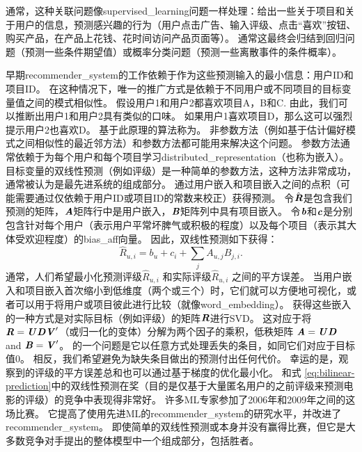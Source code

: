 通常，这种关联问题像\gls{supervised_learning}问题一样处理：给出一些关于项目和关于用户的信息，预测感兴趣的行为（用户点击广告、输入评级、点击``喜欢''按钮、 购买产品，在产品上花钱、花时间访问产品页面等）。
通常这最终会归结到回归问题（预测一些条件期望值）或概率分类问题（预测一些离散事件的条件概率）。

早期\gls{recommender_system}的工作依赖于作为这些预测输入的最小信息：用户ID和项目ID。
在这种情况下，唯一的推广方式是依赖于不同用户或不同项目的目标变量值之间的模式相似性。
假设用户1和用户2都喜欢项目A，B和C.
由此，我们可以推断出用户1和用户2具有类似的口味。
如果用户1喜欢项目D，那么这可以强烈提示用户2也喜欢D。
基于此原理的算法称为。
非参数方法（例如基于估计偏好模式之间相似性的最近邻方法）和参数方法都可能用来解决这个问题。
参数方法通常依赖于为每个用户和每个项目学习\gls{distributed_representation}（也称为嵌入）。
目标变量的双线性预测（例如评级）是一种简单的参数方法，这种方法非常成功，通常被认为是最先进系统的组成部分。
通过用户嵌入和项目嵌入之间的点积（可能需要通过仅依赖于用户ID或项目ID的常数来校正）获得预测。
令$\hat{\boldsymbol{\mathit{R}}}$是包含我们预测的矩阵，$\boldsymbol{\mathit{A}}$矩阵行中是用户嵌入，$\boldsymbol{\mathit{B}}$矩阵列中具有项目嵌入。
令$\boldsymbol{\mathit{b}}$和$\boldsymbol{\mathit{c}}$是分别包含针对每个用户（表示用户平常坏脾气或积极的程度）以及每个项目（表示其大体受欢迎程度）的\gls{bias_aff}向量。
因此，双线性预测如下获得：
\begin{equation}
\label{eq:bilinear-prediction}
 \hat{R}_{u,i} = b_u + c_i + \sum_j A_{u,j} B_{j,i}.
\end{equation}
通常，人们希望最小化预测评级$\hat{R}_{u,i}$ 和实际评级$\hat{R}_{u,i}$ 之间的平方误差。
当用户嵌入和项目嵌入首次缩小到低维度（两个或三个）时，它们就可以方便地可视化，或者可以用于将用户或项目彼此进行比较（就像\gls{word_embedding}）。
获得这些嵌入的一种方式是对实际目标（例如评级）的矩阵$\boldsymbol{\mathit{R}}$进行\gls{SVD}。
这对应于将$\boldsymbol{\mathit{R}} = \boldsymbol{\mathit{U}} \boldsymbol{\mathit{D}} \boldsymbol{\mathit{V}}'$（或归一化的变体）分解为两个因子的乘积，低秩矩阵 $\boldsymbol{\mathit{A}}=\boldsymbol{\mathit{U}} \boldsymbol{\mathit{D}}$ and $\boldsymbol{\mathit{B}} = \boldsymbol{\mathit{V}}'$。
的一个问题是它以任意方式处理丢失的条目，如同它们对应于目标值0。
相反，我们希望避免为缺失条目做出的预测付出任何代价。
幸运的是，观察到的评级的平方误差总和也可以通过基于梯度的优化最小化。
和式 \eqref{eq:bilinear-prediction}中的双线性预测在奖（目的是仅基于大量匿名用户的之前评级来预测电影的评级）的竞争中表现得非常好\citep{bennett2007netflix}。
许多\gls{ML}专家参加了2006年和2009年之间的这场比赛。
它提高了使用先进\gls{ML}的\gls{recommender_system}的研究水平，并改进了\gls{recommender_system}。
即使简单的双线性预测或本身并没有赢得比赛，但它是大多数竞争对手提出的整体模型中一个组成部分，包括胜者\citep{BigChaos-Netflix2009,Koren09}。

